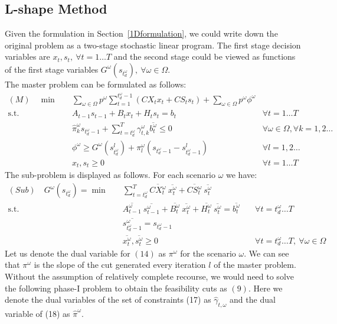 \documentclass[11pt]{article}
\begin{document}
	
	\subsection{L-shape Method}
	Given the formulation in Section~\ref{1Dformulation}, we could write down the original problem as a two-stage stochastic linear program. The first stage decision variables are \(x_t, s_t, \ \forall t = 1\dots T\) and the second stage could be viewed as functions of the first stage variables \(G^\omega(s_{t_d^\omega}), \ \forall \omega \in \Omega\).\\
	\newline The master problem can be formulated as follows:
	\begin{align}
		(M) \quad \min \quad & \sum_{\omega \in \Omega}p^\omega\sum_{t = 1}^{t_d^\omega - 1}(CX_t x_t + CS_t s_t) + \sum_{\omega \in \Omega} p^\omega \phi^\omega & \\
		\text{s.t.} \quad & A_{t-1}s_{t-1} + B_tx_{t} + H_ts_{t} = b_t \quad & \forall t = 1 \dots T\\
		& \hat{\pi}_k^\omega s_{t_d^\omega - 1} + \sum_{t = t_d^\omega}^T \gamma_{t,k}^\omega \overline{b_t^\omega} \leq 0 \quad & \forall \omega \in \Omega, \forall k = 1,2 \dots\\
		& \phi^\omega \geq G^\omega(s_{t_d^\omega}^l) + \pi^\omega_l(s_{t_d^\omega - 1} - s_{t_d^\omega - 1}^l) \quad & \forall l = 1,2 \dots\\
		& x_t, s_t \geq 0 \quad & \forall t = 1 \dots T
	\end{align}
	\noindent The sub-problem is displayed as follows. For each scenario \(\omega\) we have:
	\begin{align}
		(Sub) \quad G^\omega(s_{t_d^\omega}) = \min \quad & \sum_{t = t_d^\omega}^T \overline{CX_t^\omega} \ \overline{x_t^\omega} + \overline{CS_t^\omega} \ \overline{s_t^\omega}  &\\
		\text{s.t.} \quad & \overline{A_{t-1}^\omega} \  \overline{s_{t-1}^\omega} + \overline{B_{t}^\omega}\ \overline{x_{t}^\omega} + \overline{H_{t}^\omega}\ \overline{s_{t}^\omega} = \overline{b_t^\omega} \quad & \forall t = t_d^\omega \dots T\\
		& \overline{s_{t_d^\omega - 1}^\omega} = s_{t_d^\omega - 1} &\\
		& \overline{x_t^\omega}, \overline{s_t^\omega} \geq 0 \quad & \forall t = t_d^\omega \dots T,\ \forall \omega \in \Omega
	\end{align}
	Let us denote the dual variable for \((14)\) as \(\pi^\omega\) for the scenario \(\omega\). We can see that \(\pi^\omega\) is the slope of the cut generated every iteration \(l\) of the master problem. Without the assumption of relatively complete recourse, we would need to solve the following phase-I problem to obtain the feasibility cuts as \((9)\). Here we denote the dual variables of the set of constraints (17) as \(\hat{\gamma}_{t,\omega}\) and the dual variable of (18) as \(\hat{\pi}^\omega\).
\end{document}
